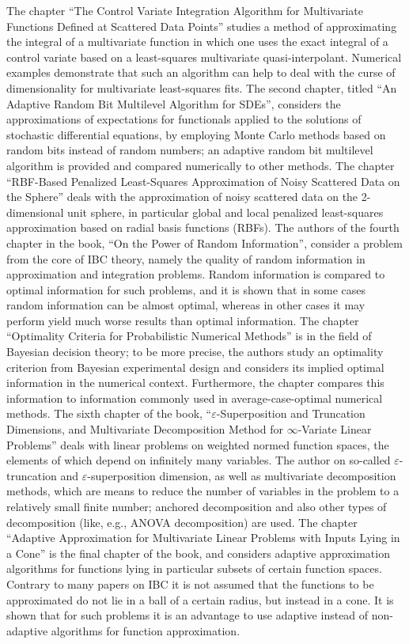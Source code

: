 \documentclass[11pt,a4paper]{article}
\begin{document}
The chapter ``The Control Variate Integration Algorithm for Multivariate Functions
Defined at Scattered Data Points'' studies a method of approximating the integral 
of a multivariate function in which one uses the exact integral of a control variate based on 
a least-squares multivariate quasi-interpolant. Numerical examples demonstrate that 
such an algorithm can help to deal with the curse of dimensionality for multivariate least-squares 
fits. The second chapter, titled ``An Adaptive Random Bit Multilevel
Algorithm for SDEs'', considers the approximations of expectations for functionals applied 
to the solutions of stochastic differential equations, by employing Monte Carlo methods 
based on random bits instead of random numbers; an adaptive random bit multilevel algorithm is provided 
and compared numerically to other methods. The chapter ``RBF-Based Penalized Least-Squares
Approximation of Noisy Scattered Data on the Sphere'' deals with the approximation of 
noisy scattered data on the 2-dimensional unit sphere, in particular global and local  
penalized least-squares approximation based on radial basis functions (RBFs). 
The authors of the fourth chapter in the book, ``On the Power of Random Information'', 
consider a problem from the core of IBC theory, namely the quality of random information 
in approximation and integration problems. Random information is compared to optimal 
information for such problems, and it is shown that in some cases random information 
can be almost optimal, whereas in other cases it may perform yield much worse 
results than optimal information. The chapter ``Optimality Criteria for Probabilistic Numerical Methods'' 
is in the field of Bayesian decision theory; to be more precise, the authors study 
an optimality criterion from Bayesian experimental design and considers its implied 
optimal information in the numerical context. Furthermore, the chapter compares this information 
to information commonly used in average-case-optimal numerical methods. The sixth chapter of the 
book, ``$\varepsilon$-Superposition and Truncation Dimensions, and Multivariate Decomposition Method
for $\infty$-Variate Linear Problems'' deals with linear problems on weighted normed function spaces, 
the elements of which depend on infinitely many variables. The author on so-called $\varepsilon$-truncation 
and $\varepsilon$-superposition dimension, as well as multivariate decomposition methods, which 
are means to reduce the number of variables in the problem to a relatively small finite number; 
anchored decomposition and also other types of decomposition (like, e.g., ANOVA decomposition) are used. 
The chapter ``Adaptive Approximation for Multivariate Linear Problems with Inputs Lying in a Cone'' is 
the final chapter of the book, and considers adaptive approximation algorithms for functions lying in particular subsets 
of certain function spaces. Contrary to many papers on IBC it is not assumed that the functions to be 
approximated do not lie in a ball of a certain radius, but instead in a cone. It is shown that for such problems 
it is an advantage to use adaptive instead of non-adaptive algorithms for function approximation. 
\end{document}
